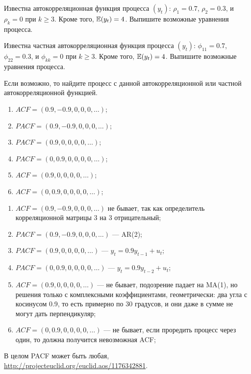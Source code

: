 \begin{problem}
  Известна автокорреляционная функция процесса $(y_t)$: $\rho_1 = 0.7$, $\rho_2 = 0.3$, и $\rho_k = 0$ при $k\geq 3$. Кроме того, $\mathbb{E}(y_t)=4$. Выпишите возможные уравнения процесса.
\begin{sol}
\end{sol}
\end{problem}

\begin{problem}
  Известна частная автокорреляционная функция процесса $(y_t)$: $\phi_{11} = 0.7$, $\phi_{22} = 0.3$, и $\phi_{kk} = 0$ при $k\geq 3$. Кроме того, $\mathbb{E}(y_t)=4$. Выпишите возможные уравнения процесса.
\begin{sol}
\end{sol}
\end{problem}

\begin{problem}
Если возможно, то найдите процесс с данной автокорреляционной или частной автокорреляционной функцией.

\begin{enumerate}
  \item $ACF = (0.9, -0.9, 0, 0, 0, \ldots)$;
  \item $PACF = (0.9, -0.9, 0, 0, 0, \ldots)$;
  \item $PACF = (0.9, 0, 0, 0, 0, \ldots)$;
  \item $PACF = (0, 0.9, 0, 0, 0, 0, \ldots)$;
  \item $ACF = (0.9, 0, 0, 0, 0, \ldots)$;
  \item $ACF = (0, 0.9, 0, 0, 0, 0, \ldots)$;
\end{enumerate}

\begin{sol}
  \begin{enumerate}
    \item $ACF = (0.9, -0.9, 0, 0, 0, \ldots)$ не бывает, так как определитель корреляционной матрицы 3 на 3 отрицательный;
    \item $PACF = (0.9, -0.9, 0, 0, 0, \ldots)$ — AR(2);
    \item $PACF = (0.9, 0, 0, 0, 0, \ldots)$ — $y_t = 0.9y_{t-1} + u_t$;
    \item $PACF = (0, 0.9, 0, 0, 0, 0, \ldots)$ — $y_t = 0.9y_{t-2} + u_t$;
    \item $ACF = (0.9, 0, 0, 0, 0, \ldots)$ — не бывает, подозрение падает на MA(1), но решения только с комплексными коэффициентами, геометрически: два угла с косинусом 0.9, то есть примерно по 30 градусов, и они даже в сумме не могут дать перпендикуляр;
    \item $ACF = (0, 0.9, 0, 0, 0, 0, \ldots)$ — не бывает, если проредить процесс через один, то должна получится невозможная ACF;
  \end{enumerate}
   В целом PACF может быть любая,
   \url{http://projecteuclid.org/euclid.aos/1176342881}.
\end{sol}
\end{problem}



